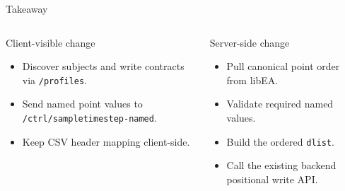 \documentclass[aspectratio=169]{beamer}
\begin{document}
\begin{frame}{Takeaway}
\begin{columns}[T]
\begin{block}{Client-visible change}
  \begin{itemize}
    \item Discover subjects and write contracts via \texttt{/profiles}.
    \item Send named point values to \texttt{/ctrl/sampletimestep-named}.
    \item Keep CSV header mapping client-side.
  \end{itemize}
\end{block}

\begin{block}{Server-side change}
  \begin{itemize}
    \item Pull canonical point order from libEA.
    \item Validate required named values.
    \item Build the ordered \texttt{dlist}.
    \item Call the existing backend positional write API.
  \end{itemize}
\end{block}
\end{columns}
\end{frame}
\end{document}
